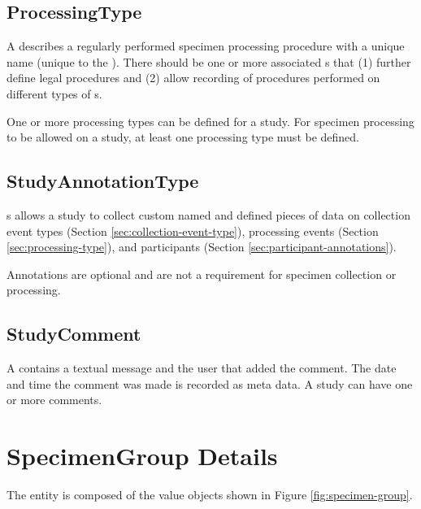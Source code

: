 \subsection*{ProcessingType}

A  describes a regularly performed specimen
processing procedure with a unique name (unique to the
). There should be one or more associated
s that (1) further define legal procedures and (2)
allow recording of procedures performed on different types of
s.

One or more processing types can be defined for a study. For specimen
processing to be allowed on a study, at least one processing type must be
defined.

\subsection*{StudyAnnotationType}

s allows a study to collect custom named and
defined pieces of data on collection event types (Section
\ref{sec:collection-event-type}), processing events (Section
\ref{sec:processing-type}), and participants (Section
\ref{sec:participant-annotations}).

Annotations are optional and are not a requirement for specimen collection or
processing.

\subsection*{StudyComment}

A  contains a textual message and the user that
added the comment. The date and time the comment was made is recorded as meta
data. A study can have one or more comments.

\section{SpecimenGroup Details}
\label{sec:specimen-group}

The  entity is composed of the value objects shown
in Figure \ref{fig:specimen-group}.

